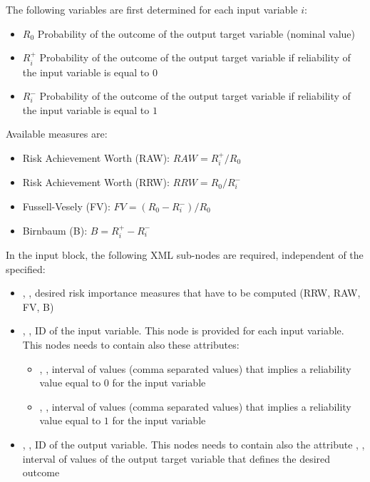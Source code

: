 The following variables are first determined for each input variable $i$:
\begin{itemize}
   \item $R_0$ Probability of the outcome of the output target variable (nominal value)
   \item $R^{+}_i$ Probability of the outcome of the output target variable if reliability of the input variable is equal to $0$
   \item $R^{-}_i$ Probability of the outcome of the output target variable if reliability of the input variable is equal to $1$
\end{itemize}

Available measures are:
\begin{itemize}
   \item Risk Achievement Worth (RAW): $RAW = R^{+}_i / R_0 $
   \item Risk Achievement Worth (RRW): $RRW = R_0 / R^{-}_i$
   \item Fussell-Vesely (FV): $FV = (R_0 - R^{-}_i) / R_0$
   \item Birnbaum (B): $B = R^{+}_i - R^{-}_i$
\end{itemize}

In the  input block, the following XML sub-nodes are required,
independent of the  specified:

\begin{itemize}
   \item {}, , desired risk importance measures that have to be computed (RRW, RAW, FV, B)
   \item {}, , ID of the input variable. This node is provided for each input variable. This nodes needs to contain also these attributes:
     \begin{itemize}
       \item {}, , interval of values (comma separated values) that implies a reliability value equal to $0$ for the input variable
       \item {}, , interval of values (comma separated values) that implies a reliability value equal to $1$ for the input variable
     \end{itemize}
   \item {}, , ID of the output variable. This nodes needs to contain also the attribute , , interval of
                                                             values of the output target variable that defines the desired outcome
\end{itemize}

